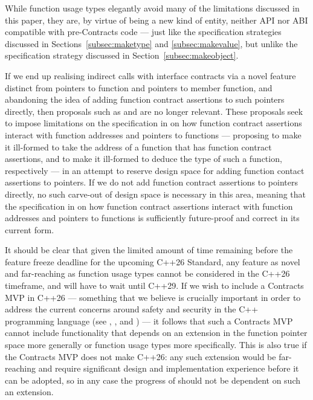 While function usage types elegantly avoid many of the limitations discussed in this paper, they are, by virtue of being a new kind of entity, neither API nor ABI compatible with pre-Contracts code --- just like the specification strategies discussed in Sections~\ref{subsec:maketype} and \ref{subsec:makevalue}, but unlike the specification strategy discussed in Section~\ref{subsec:makeobject}.

If we end up realising indirect calls with interface contracts via a novel feature distinct from pointers to function and pointers to member function, and abandoning the idea of adding function contract assertions to such pointers directly, then proposals such as \cite{P3221R0} and \cite{P3250R0} are no longer relevant. These proposals seek to impose limitations on the specification in \cite{P2900R7} on how function contract assertions interact with function addresses and pointers to functions --- proposing to make it ill-formed to take the address of a function that has function contract assertions, and to make it ill-formed to deduce the type of such a function, respectively --- in an attempt to reserve design space for adding function contact assertions to pointers. If we do not add function contract assertions to pointers directly, no such carve-out of design space is necessary in this area, meaning that the specification in \cite{P2900R7} on how function contract assertions interact with function addresses and pointers to functions is sufficiently future-proof and correct in its current form.

It should be clear that given the limited amount of time remaining before the feature freeze deadline for the upcoming C++26 Standard, any feature as novel and far-reaching as function usage types cannot be considered in the C++26 timeframe, and will have to wait until C++29. If we wish to include a Contracts MVP in C++26 --- something that we believe is crucially important in order to address the current concerns around safety and security in the C++ programming language (see \cite{P3269R0}, \cite{P3276R0}, and \cite{P3297R0}) --- it follows that such a Contracts MVP cannot include functionality that depends on an extension in the function pointer space more generally or function usage types more specifically. This is also true if the Contracts MVP does not make C++26: any such extension would be far-reaching and require significant design and implementation experience before it can be adopted, so in any case the progress of \cite{P2900R7} should not be dependent on such an extension.

